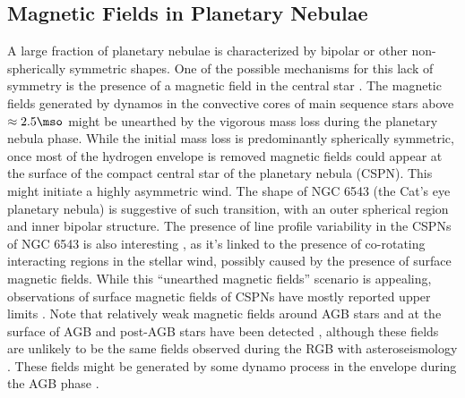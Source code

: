 \subsection{Magnetic Fields in Planetary Nebulae}
A large fraction of planetary nebulae is characterized by bipolar or other non-spherically symmetric shapes. 
One of the possible mechanisms for this lack of symmetry is the presence of a magnetic field in the central star \citep[See e.g.][]{Garc_a_Segura_1997,Chevalier_1994}. The magnetic fields generated by dynamos in the convective cores of main sequence stars above $\approx 2.5\mso$ might be unearthed by the vigorous mass loss during the planetary nebula phase. While the initial mass loss is predominantly spherically symmetric, once most of the hydrogen envelope is removed magnetic fields could appear at the surface of the compact central star of the planetary nebula (CSPN). This might initiate a highly asymmetric wind. The shape of NGC 6543 (the Cat's eye planetary nebula) is suggestive of such transition, with an outer spherical region and inner bipolar structure. The presence of line profile variability in the CSPNs of NGC 6543 is also interesting \cite{Prinja_2012}, as it's linked to the presence of co-rotating interacting regions in the stellar wind, possibly caused by the presence of surface magnetic fields. While this ``unearthed magnetic fields'' scenario is appealing, observations of surface magnetic fields of CSPNs have mostly reported upper limits \citep{Jordan_2012,Leone_2014,Asensio_Ramos_2014}. Note that relatively weak  magnetic fields around AGB stars \cite{Leal_Ferreira_2013} and at the surface of AGB and post-AGB stars have been detected \cite{L_bre_2014,Sabin_2014}, although these fields are unlikely to be the same fields observed during the RGB with asteroseismology \citep{Fuller_2015}. These fields might be generated by some dynamo process in the envelope during the AGB phase \citep[e.g.][]{Nordhaus_2007}.


